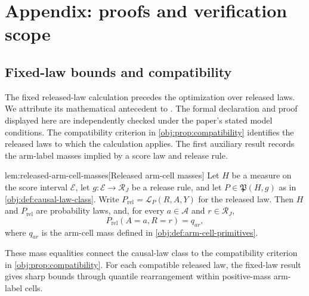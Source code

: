 \section{Appendix: proofs and verification scope}

\subsection{Fixed-law bounds and compatibility}

The fixed released-law calculation precedes the optimization over released laws. We attribute its mathematical antecedent to \citet[Theorem 3.2 and eq. (3.1)]{FanShermanShum2014}. The formal declaration and proof displayed here are independently checked under the paper's stated model conditions. The compatibility criterion in \cref{obj:prop:compatibility} identifies the released laws to which the calculation applies. The first auxiliary result records the arm-label masses implied by a score law and release rule.

\begin{lemmav}{lem:released-arm-cell-masses}[Released arm-cell masses]
Let \(H\) be a measure on the score interval \(\mathcal E\), let \(g:\mathcal E\to\mathcal R_J\) be a release rule, and let \(P\in\mathfrak P(H,g)\) as in \cref{obj:def:causal-law-class}. Write \(P_{\mathrm{rel}}=\mathcal L_P(R,A,Y)\) for the released law. Then \(H\) and \(P_{\mathrm{rel}}\) are probability laws, and, for every \(a\in\mathcal A\) and \(r\in\mathcal R_J\),
\[
P_{\mathrm{rel}}(A=a,R=r)=q_{ar},
\]
where \(q_{ar}\) is the arm-cell mass defined in \cref{obj:def:arm-cell-primitives}.
\end{lemmav}

These mass equalities connect the causal-law class to the compatibility criterion in \cref{obj:prop:compatibility}. For each compatible released law, the fixed-law result gives sharp bounds through quantile rearrangement within positive-mass arm-label cells.

